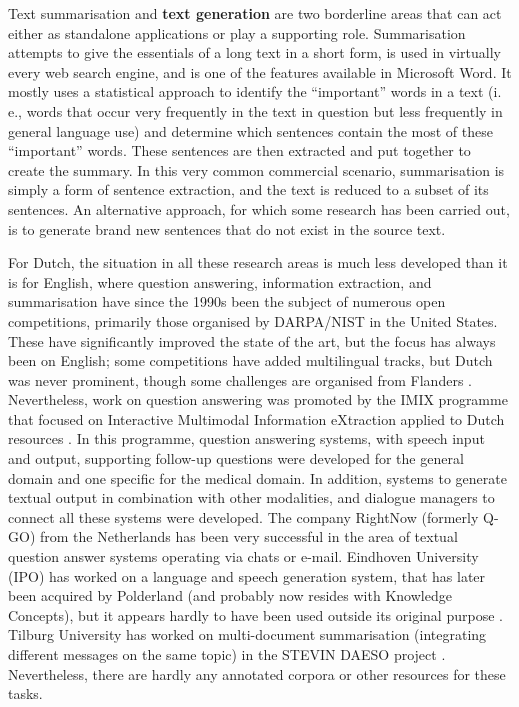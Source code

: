 \documentclass[]{../../metanetpaper}
\begin{document}
\begin{multicols}{2}
    Text summarisation and \textbf{text generation} are two borderline areas that can act either as standalone applications or play a supporting role. Summarisation attempts to give the essentials of a long text in a short form, is used in virtually every web search engine, and is one of the features available in Microsoft Word. It mostly uses a statistical approach to identify the “important” words in a text (i.\,e., words that occur very frequently in the text in question but less frequently in general language use) and determine which sentences contain the most of these “important” words. These sentences are then extracted and put together to create the summary. In this very common commercial scenario, summarisation is simply a form of sentence extraction, and the text is reduced to a subset of its sentences. An alternative approach, for which some research has been carried out, is to generate brand new sentences that do not exist in the source text.


For Dutch, the situation in all these research areas is much less developed than it is for English, where question answering, information extraction, and summarisation have since the 1990s been the subject of numerous open competitions, primarily those organised by DARPA/NIST in the United States. These have significantly improved the state of the art, but the focus has always been on English; some competitions have added multilingual tracks, but Dutch was never prominent, though some challenges are organised from Flanders \cite{SemEval}.  Nevertheless, work on question answering was promoted by the IMIX programme that focused on Interactive Multimodal Information eXtraction applied to Dutch resources \cite{IMIX}.  In this programme, question answering systems, with speech input and output, supporting follow-up questions were developed for the general domain and one specific for the medical domain. In addition, systems to generate textual output in combination with other modalities, and dialogue managers to connect all these systems were developed. The company RightNow (formerly Q-GO) from the Netherlands has been very successful in the area of textual question answer systems operating via chats or e-mail.  Eindhoven University (IPO) has worked on a language and speech generation system, that has later been acquired by Polderland (and probably now resides with Knowledge Concepts), but it appears hardly to have been used outside its original purpose \cite{Theune:2003}.  Tilburg University has worked on multi-document summarisation (integrating different messages on the same topic) in the STEVIN DAESO project \cite{DAESO}.  Nevertheless, there are hardly any annotated corpora or other resources for these tasks.


\end{multicols}
\end{document}
